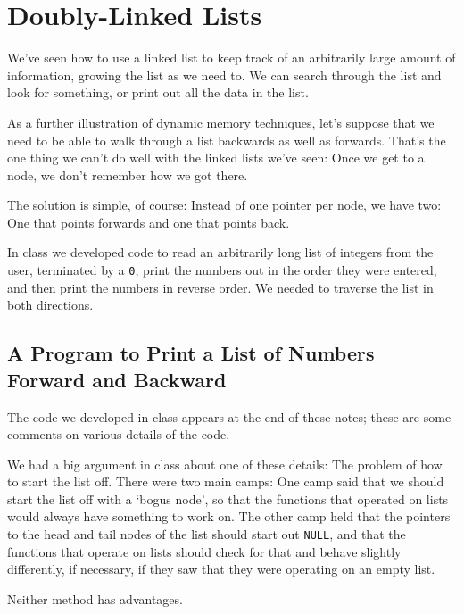 %
%
%

\section{Doubly-Linked Lists}

We've seen how to use a linked list to keep track of an arbitrarily
large amount of information, growing the list as we need to.  We can
search through the list and look for something, or print out all the
data in the list.

As a further illustration of dynamic memory techniques, let's suppose
that we need to be able to walk through a list backwards as well as
forwards.  That's the one thing we can't do well with the linked lists
we've seen:  Once we get to a node, we don't remember how we got there. 

The solution is simple, of course:  Instead of one pointer per node, we
have two:  One that points forwards and one that points back.  

In class we developed code to read an arbitrarily long list of integers
from the user, terminated by a {\tt 0}, print the numbers out in the
order they were entered, and then print the numbers in reverse order.
We needed to traverse the list in both directions.

\subsection{A Program to Print a List of Numbers Forward and Backward}

The code we developed in class appears at the end of these notes; these
are some comments on various details of the code.

We had a big argument in class about one of these details: The problem
of how to start the list off.  There were two main camps: One camp said
that we should start the list off with a `bogus node', so that the
functions that operated on lists would always have something to work on.
The other camp held that the pointers to the head and tail nodes of the
list should start out {\tt NULL}, and that the functions that operate on
lists should check for that and behave slightly differently, if
necessary, if they saw that they were operating on an empty list.

Neither method has advantages.  

